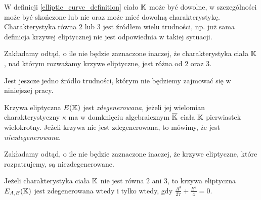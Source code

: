 W definicji \ref{elliptic_curve_definition} ciało $\mathbb{K}$ może być dowolne,
w szczególności może być skończone lub nie
oraz może mieć dowolną charakterystykę.
Charakterystyka równa $2$ lub $3$ jest źródłem wielu trudności,
np. już sama definicja krzywej eliptycznej
nie jest odpowiednia w takiej sytuacji.

\begin{remark}
Zakładamy odtąd, o ile nie będzie zaznaczone inaczej,
że charakterystyka ciała $\mathbb{K}$, nad którym rozważamy krzywe eliptyczne,
jest różna od $2$ oraz $3$.
\end{remark}

Jest jeszcze jedno źródło trudności,
którym nie będziemy zajmować się w niniejszej pracy.

\begin{definition}
Krzywa eliptyczna $E(\mathbb{K})$ jest \emph{zdegenerowana},
jeżeli jej wielomian charakterystyczny $\kappa$
ma w domknięciu algebraicznym $\overline{\mathbb{K}}$ ciała $\mathbb{K}$
pierwiastek wielokrotny.
Jeżeli krzywa nie jest zdegenerowana,
to mówimy, że jest \emph{niezdegenerowana}.
\end{definition}

\begin{remark}
Zakładamy odtąd, o ile nie będzie zaznaczone inaczej,
że krzywe eliptyczne, które rozpatrujemy,
są niezdegenerowane.
\end{remark}

\begin{theorem}
Jeżeli charakterystyka ciała $\mathbb{K}$ nie jest równa $2$ ani $3$,
to krzywa eliptyczna $E_{A,B}(\mathbb{K})$ jest zdegenerowana wtedy i tylko wtedy,
gdy $\frac{A^3}{27} + \frac{B^2}{4} = 0$.
\end{theorem}
